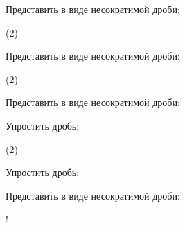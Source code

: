 \begin{class}[number=2]
\begin{listofex}
\begin{tasks}
	\end{tasks}
	\item Представить в виде несократимой дроби:
	\begin{tasks}(2)
		\task {}
		\task {}
		\task {}
		\task {}
		\task {}
	\end{tasks}
	\item Представить в виде несократимой дроби:
	\begin{tasks}(2)
		\task {}
		\task {}
		\task {}
		\task {}
		\task {}
		\task {}
		\task {}
		\task {}
	\end{tasks}
	\item Представить в виде несократимой дроби:
	\begin{itasks}[2]
		\task {}
		\task {}
		\task {}
	\end{itasks}
	\end{listofex}
\end{class}

\begin{homework}[number=1]
	\begin{listofex}
	\item Упростить дробь:
	\begin{tasks}(2)
		\task {}
		\task {}
		\task {}
		\task {}
		\task {}
		\task {}
	\end{tasks}
	\item {}
	\item Упростить дробь:
	\begin{itasks}[2]
		\task {}
		\task {}
		\task {}
		\task {}
		\task {}
		\task {}
	\end{itasks}
	\item Представить в виде несократимой дроби:
	\begin{itasks}[2]
		\task {}
		\task {}
		\task! 
	\end{itasks}
	\end{listofex}
\end{homework}

